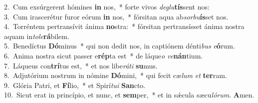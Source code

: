 {2.~}Cum exsúrgerent hómines \textbf{in} nos,~* forte vivos \textit{de}\textit{glu}\textbf{tís}sent nos:\\
{3.~}Cum irascerétur furor eórum \textbf{in} nos,~* fórsitan aqua ab\textit{sor}\textit{bu}\textbf{ís}set nos.\\
{4.~}Torréntem pertransívit ánima \textbf{no}stra:~* fórsitan pertransísset ánima nostra aquam in\textit{to}\textit{le}\textbf{rá}bilem.\\
{5.~}Benedíctus \textbf{Dó}minus~* qui non dedit nos, in captiónem dénti\textit{bus} \textit{e}\textbf{ó}rum.\\
{6.~}Anima nostra sicut passer e\textbf{rép}ta est~* de láque\textit{o} \textit{ve}\textbf{nán}tium.\\
{7.~}Láqueus con\textbf{trí}tus est,~* et nos libe\textit{rá}\textit{ti} \textbf{su}mus.\\
{8.~}Adjutórium nostrum in nómine \textbf{Dó}mini,~* qui fecit cæ\textit{lum} \textit{et} \textbf{ter}ram.\\
{9.~}Glória Patri, et \textbf{Fí}lio,~* et Spirí\textit{tu}\textit{i} \textbf{San}cto.\\
{10.~}Sicut erat in princípio, et nunc, et \textbf{sem}per,~* et in sǽcula sæcu\textit{ló}\textit{rum}. \textbf{A}men.\\
